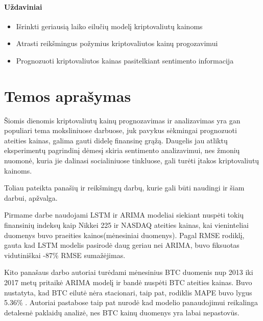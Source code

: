 \documentclass[12pt,a4paper]{article}
\begin{document}
\paragraph{Uždaviniai}
\begin{itemize}
    \item Išrinkti geriausią laiko eilučių modelį kriptovaliutų kainoms
    \item Atrasti reikšmingus požymius kriptovaliutos kainų progozavimui
    \item Prognozuoti kriptovaliutos kainas pasitelkiant sentimento informacija
\end{itemize}

\newpage

\section{Temos aprašymas}

Šiomis dienomis kriptovaliutų kainų prognozavimas ir analizavimas yra gan populiari tema moksliniuose darbuose, juk pavykus sėkmingai prognozuoti ateities kainas, galima gauti didelę finansinę grąžą. Daugelis jau atliktų eksperimentų pagrindinį dėmesį skiria sentimento analizavimui, nes žmonių nuomonė, kuria jie dalinasi socialiniuose tinkluose, gali turėti įtakos kriptovaliutų kainoms.

Toliau pateikta panašių ir reikšmingų darbų, kurie gali būti naudingi ir šiam darbui, apžvalga.
\newline

Pirmame darbe \cite{namini2018namin}  naudojami LSTM ir ARIMA modeliai siekiant nuspėti tokių finansinių indeksų kaip Nikkei 225 ir NASDAQ ateities kainas, kai vieninteliai duomenys buvo praeities kainos(mėnesiniai duomenys). Pagal RMSE rodiklį, gauta kad LSTM modelis pasirodė daug geriau nei ARIMA, buvo fiksuotas vidutiniškai -87\%  RMSE sumažėjimas.\newline

Kito panašaus darbo \cite{bakar2017nashirah} autoriai turėdami mėnesinius BTC duomenis nup 2013 iki 2017 metų pritaikė ARIMA modelį ir bandė nuspėti BTC ateities kainas. Buvo nustatyta, kad BTC eilutė nėra stacionari, taip pat, rodiklis MAPE buvo lygus 5.36\% . Autoriai pastabose taip pat nurodė kad modelio panaudojimui reikalinga detalesnė paklaidų analizė, nes BTC kainų duomenys yra labai nepastovūs.\newline
\end{document}
